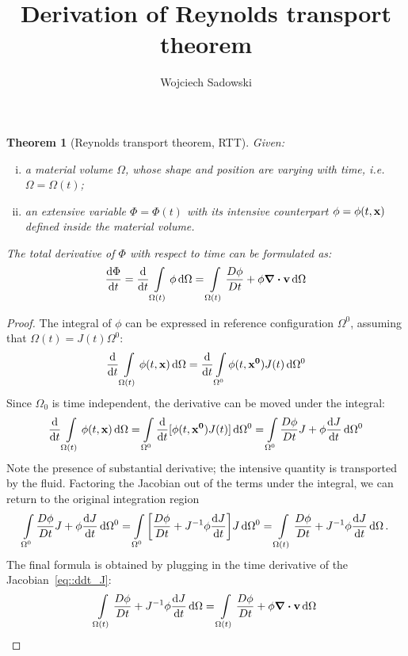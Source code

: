 \documentclass{article}
\title{Derivation of Reynolds transport theorem}
\author{Wojciech Sadowski}
\newtheorem{theorem}{Theorem}
\begin{document}
\maketitle

\begin{theorem}[Reynolds transport theorem, RTT]
  Given:
  \begin{enumerate}[(i)]
    \item a material volume \(\Omega\), whose shape and position are varying with time,
      i.e.\ \(\Omega = \Omega(t)\);
    \item an extensive variable \(\Phi = \Phi(t)\) with its intensive counterpart 
      \(\phi = \phi(t, \vb{x})\)  defined inside the material volume.
  \end{enumerate}
	The total derivative of \(\Phi\) with respect to time can be formulated as:
  \begin{equation}
    \dv{\Phi}{t} = \dv{t} \int\limits_{\Omega(t)} \phi \dd{\Omega}
    = \int\limits_{\Omega(t)} \dfrac{D\phi}{Dt} + \phi \div{\vb{v}} \dd{\Omega}
  \end{equation}
\end{theorem}

\begin{proof}
	The integral of \(\phi\) can be expressed in reference configuration 
  \(\Omega^0\), assuming that \(\Omega(t) = J(t)\Omega^0\):
	\begin{equation}
    \dv{t} \int\limits_{\Omega(t)} \phi(t, \vb{x}) \dd{\Omega} = 
    \dv{t} \int\limits_{\Omega^0} \phi(t, \vb{x^0})J(t) \dd{\Omega^0} 
	\end{equation}
	Since \(\Omega_0\) is time independent, the derivative can be moved
  under the integral:
	\begin{equation}
    \dv{t} \int\limits_{\Omega(t)} \phi(t, \vb{x}) \dd{\Omega} = 
    \int\limits_{\Omega^0} \dv{t}[\phi(t, \vb{x^0})J(t)] \dd{\Omega^0} =
    \int\limits_{\Omega^0} \dfrac{D\phi}{Dt}J + \phi\dv{J}{t} \dd{\Omega^0} 
	\end{equation}
  Note the presence of substantial derivative; the intensive quantity is
  transported by the fluid.
	Factoring the Jacobian out of the terms under the integral, we can return
  to the original integration region
	\begin{equation}
    \int\limits_{\Omega^0} \dfrac{D\phi}{Dt}J + \phi\dv{J}{t} \dd{\Omega^0} = 
    \int\limits_{\Omega^0} \qty[\dfrac{D\phi}{Dt} + J^{-1}\phi\dv{J}{t}]J \dd{\Omega^0} = 
    \int\limits_{\Omega(t)} \dfrac{D\phi}{Dt} + J^{-1}\phi\dv{J}{t} \dd{\Omega}.
	\end{equation}
  The final formula is obtained by plugging in the time derivative of the 
  Jacobian~\autoref{eq::ddt_J}:
  \begin{equation*}
    \int\limits_{\Omega(t)} \dfrac{D\phi}{Dt} + J^{-1}\phi\dv{J}{t} \dd{\Omega}
    = \int\limits_{\Omega(t)} \dfrac{D\phi}{Dt} + \phi \div\vb{v} \dd{\Omega}
  \end{equation*}

  
\end{proof}
\end{document}
